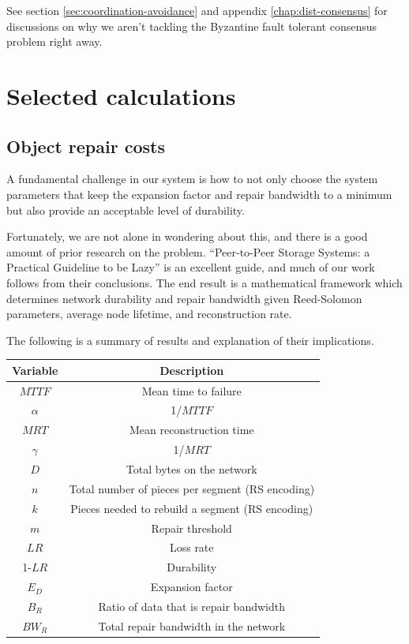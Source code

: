 \documentclass[8pt,fleqn,openany]{book}
\begin{document}
See section \ref{sec:coordination-avoidance} and
appendix \ref{chap:dist-consensus} for discussions on why we aren't tackling
the Byzantine fault tolerant consensus problem right away.

\chapter{Selected calculations}\label{chap:selected-calcs}

\section{Object repair costs}

A fundamental challenge in our system is how to not only choose the system
parameters that keep the expansion factor and repair bandwidth to a minimum but
also provide an acceptable level of durability.

Fortunately, we are not alone in wondering about this, and there is a good
amount of prior research on the problem.
``Peer-to-Peer Storage Systems: a Practical Guideline to be Lazy'' \cite{p2p-lazy} is an excellent guide, and much of our work follows from their conclusions.
The end result is a mathematical framework which determines network durability
and repair bandwidth given Reed-Solomon parameters, average node lifetime, and
reconstruction rate.

The following is a summary of results and explanation of their implications.

\begin{center}
\begin{tabular}{| c | c |}\hline
Variable & Description\\\hline
$MTTF$ & Mean time to failure \\
$\alpha$ & 1/$MTTF$\\
$MRT$ & Mean reconstruction time \\
$\gamma$ & 1/$MRT$\\
$D$&Total bytes on the network\\
$n$ & Total number of pieces per segment (RS encoding)\\
$k$ & Pieces needed to rebuild a segment (RS encoding)\\
$m$ & Repair threshold\\
$LR$ & Loss rate\\
1-$LR$ & Durability\\
$E_D$ & Expansion factor\\
$B_R$ & Ratio of data that is repair bandwidth\\
$BW_R$ & Total repair bandwidth in the network\\
\hline
\end{tabular}
\end{center}
\end{document}
